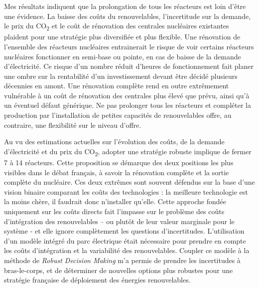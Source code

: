 Mes résultats indiquent que la prolongation de tous les réacteurs est loin d’être une évidence. La baisse des coûts du renouvelables, l’incertitude sur la demande, le prix du CO\textsubscript{2} et le coût de rénovation des centrales nucléaires existantes plaident pour une stratégie plus diversifiée et plus flexible. 
Une rénovation de l'ensemble des réacteurs nucléaires entrainerait le risque de voir certains réacteurs nucléaires fonctionner en semi-base ou pointe, en cas de baisse de la demande d’électricité. Ce risque d'un nombre réduit d'heures de fonctionnement fait planer une ombre sur la rentabilité d'un investissement devant être décidé plusieurs décennies en amont.
Une rénovation complète rend en outre extrêmement vulnérable à un coût de rénovation des centrales plus élevé que prévu, ainsi qu'à un éventuel défaut générique. 
Ne pas prolonger tous les réacteurs et compléter la production par l'installation de petites capacités de renouvelables offre, au contraire, une flexibilité sur le niveau d'offre.

Au vu des estimations actuelles sur l'évolution des coûts, de la demande d'électricité et du prix du CO\textsubscript{2}, adopter une stratégie robuste implique de fermer 7 à 14 réacteurs. Cette proposition se démarque des deux positions les plus visibles dans le débat français, à savoir la rénovation complète et la sortie complète du nucléaire. Ces deux extrêmes sont souvent défendus sur la base d’une vision binaire comparant les coûts des technologies : la meilleure technologie est la moins chère, il faudrait donc n'installer qu'elle. Cette approche fondée uniquement sur les coûts directs fait l’impasse sur le problème des coûts d’intégration des renouvelables – ou plutôt de leur valeur marginale pour le système - et elle ignore complètement les questions d’incertitudes. L'utilisation d'un modèle intégré du parc électrique était nécessaire pour prendre en compte les coûts d'intégration et la variabilité des renouvelables. Coupler ce modèle à la méthode de \textit{Robust Decision Making} m'a permis de prendre les incertitudes à bras-le-corps, et de déterminer de nouvelles options plus robustes pour une stratégie française de déploiement des énergies renouvelables.

